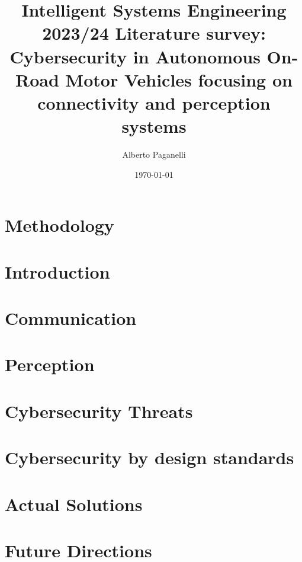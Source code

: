 \documentclass{scrartcl}
\title{\LARGE
Intelligent Systems Engineering 2023/24 \newline
\newline
Literature survey: \\
Cybersecurity in Autonomous On-Road Motor Vehicles focusing on connectivity and perception systems
}
\author{
    Alberto Paganelli \\ \emailaddr{alberto.paganelli3@studio.unibo.it}
}
\date{\today}
\begin{document}
    \maketitle
    \begin{abstract}
    
    \end{abstract}

    \newpage
    \tableofcontents
    \newpage

    \section{Methodology}\label{sec:methodology}
    

    \section{Introduction}\label{sec:introduction}
    

    \section{Communication}\label{sec:communication}
    

    \section{Perception}\label{sec:perception}
    

    \section{Cybersecurity Threats}\label{sec:cybersecurity-threats}
    

    \section{Cybersecurity by design standards}\label{sec:cybersecurity-by-design-standards}
    

    \section{Actual Solutions}\label{sec:actual-solutions}
    

    \section{Future Directions}\label{sec:future-directions}
    
\end{document}
